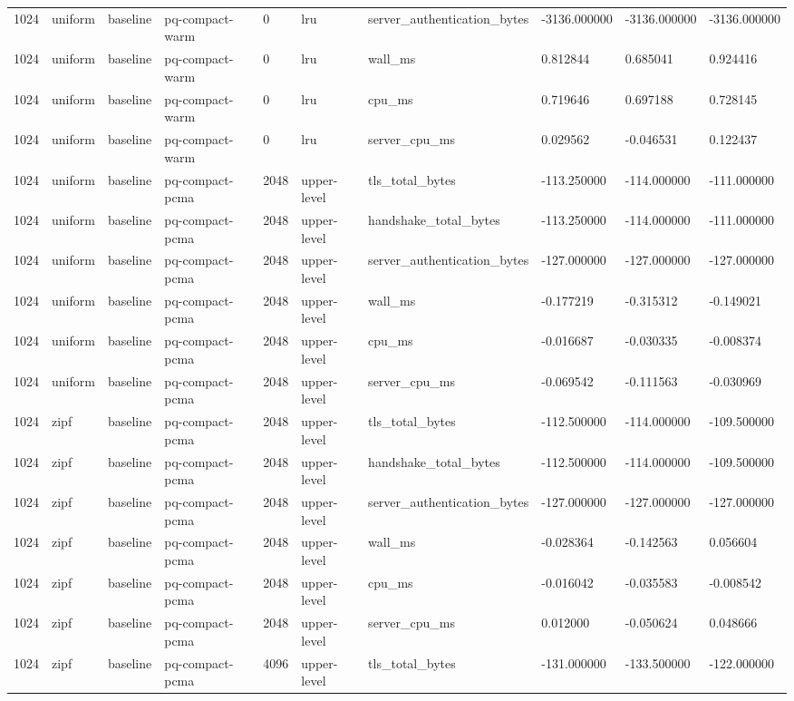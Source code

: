 \begin{tabular}{llllllllll}
1024 & uniform & baseline & pq-compact-warm & 0 & lru & server\_authentication\_bytes & -3136.000000 & -3136.000000 & -3136.000000 \\
1024 & uniform & baseline & pq-compact-warm & 0 & lru & wall\_ms & 0.812844 & 0.685041 & 0.924416 \\
1024 & uniform & baseline & pq-compact-warm & 0 & lru & cpu\_ms & 0.719646 & 0.697188 & 0.728145 \\
1024 & uniform & baseline & pq-compact-warm & 0 & lru & server\_cpu\_ms & 0.029562 & -0.046531 & 0.122437 \\
1024 & uniform & baseline & pq-compact-pcma & 2048 & upper-level & tls\_total\_bytes & -113.250000 & -114.000000 & -111.000000 \\
1024 & uniform & baseline & pq-compact-pcma & 2048 & upper-level & handshake\_total\_bytes & -113.250000 & -114.000000 & -111.000000 \\
1024 & uniform & baseline & pq-compact-pcma & 2048 & upper-level & server\_authentication\_bytes & -127.000000 & -127.000000 & -127.000000 \\
1024 & uniform & baseline & pq-compact-pcma & 2048 & upper-level & wall\_ms & -0.177219 & -0.315312 & -0.149021 \\
1024 & uniform & baseline & pq-compact-pcma & 2048 & upper-level & cpu\_ms & -0.016687 & -0.030335 & -0.008374 \\
1024 & uniform & baseline & pq-compact-pcma & 2048 & upper-level & server\_cpu\_ms & -0.069542 & -0.111563 & -0.030969 \\
1024 & zipf & baseline & pq-compact-pcma & 2048 & upper-level & tls\_total\_bytes & -112.500000 & -114.000000 & -109.500000 \\
1024 & zipf & baseline & pq-compact-pcma & 2048 & upper-level & handshake\_total\_bytes & -112.500000 & -114.000000 & -109.500000 \\
1024 & zipf & baseline & pq-compact-pcma & 2048 & upper-level & server\_authentication\_bytes & -127.000000 & -127.000000 & -127.000000 \\
1024 & zipf & baseline & pq-compact-pcma & 2048 & upper-level & wall\_ms & -0.028364 & -0.142563 & 0.056604 \\
1024 & zipf & baseline & pq-compact-pcma & 2048 & upper-level & cpu\_ms & -0.016042 & -0.035583 & -0.008542 \\
1024 & zipf & baseline & pq-compact-pcma & 2048 & upper-level & server\_cpu\_ms & 0.012000 & -0.050624 & 0.048666 \\
1024 & zipf & baseline & pq-compact-pcma & 4096 & upper-level & tls\_total\_bytes & -131.000000 & -133.500000 & -122.000000 \\

\end{tabular}
